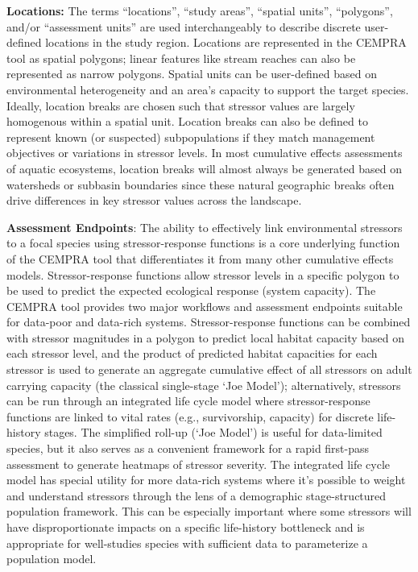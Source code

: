 \documentclass[
  letterpaper,
  DIV=11,
  numbers=noendperiod]{scrreprt}
\begin{document}
\textbf{Locations:} The terms ``locations'', ``study areas'', ``spatial
units'', ``polygons'', and/or ``assessment units'' are used
interchangeably to describe discrete user-defined locations in the study
region. Locations are represented in the CEMPRA tool as spatial
polygons; linear features like stream reaches can also be represented as
narrow polygons. Spatial units can be user-defined based on
environmental heterogeneity and an area's capacity to support the target
species. Ideally, location breaks are chosen such that stressor values
are largely homogenous within a spatial unit. Location breaks can also
be defined to represent known (or suspected) subpopulations if they
match management objectives or variations in stressor levels. In most
cumulative effects assessments of aquatic ecosystems, location breaks
will almost always be generated based on watersheds or subbasin
boundaries since these natural geographic breaks often drive differences
in key stressor values across the landscape.

\textbf{Assessment Endpoints}: The ability to effectively link
environmental stressors to a focal species using stressor-response
functions is a core underlying function of the CEMPRA tool that
differentiates it from many other cumulative effects models.
Stressor-response functions allow stressor levels in a specific polygon
to be used to predict the expected ecological response (system
capacity). The CEMPRA tool provides two major workflows and assessment
endpoints suitable for data-poor and data-rich systems.
Stressor-response functions can be combined with stressor magnitudes in
a polygon to predict local habitat capacity based on each stressor
level, and the product of predicted habitat capacities for each stressor
is used to generate an aggregate cumulative effect of all stressors on
adult carrying capacity (the classical single-stage `Joe Model');
alternatively, stressors can be run through an integrated life cycle
model where stressor-response functions are linked to vital rates (e.g.,
survivorship, capacity) for discrete life-history stages. The simplified
roll-up (`Joe Model') is useful for data-limited species, but it also
serves as a convenient framework for a rapid first-pass assessment to
generate heatmaps of stressor severity. The integrated life cycle model
has special utility for more data-rich systems where it's possible to
weight and understand stressors through the lens of a demographic
stage-structured population framework. This can be especially important
where some stressors will have disproportionate impacts on a specific
life-history bottleneck and is appropriate for well-studies species with
sufficient data to parameterize a population model.
\end{document}

